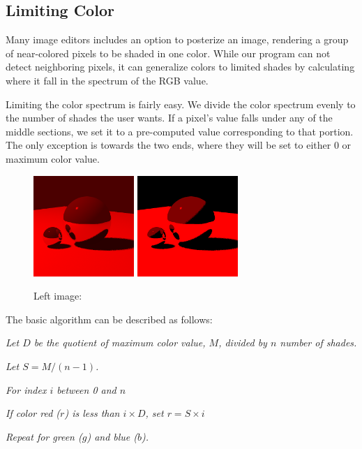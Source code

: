 \documentclass{acmsiggraph}
\begin{document}
\subsection{Limiting Color}
Many image editors includes an option to posterize an image, rendering a group
of near-colored pixels to be shaded in one color.  While our program can not
detect neighboring pixels, it can generalize colors to limited shades by
calculating where it fall in the spectrum of the RGB value.

Limiting the color spectrum is fairly easy.  We divide the color spectrum
evenly to the number of shades the user wants.  If a pixel's value falls under
any of the middle sections, we set it to a pre-computed value corresponding to
that portion.  The only exception is towards the two ends, where they will be
set to either 0 or maximum color value.
\begin{figure}[htp]
\centering
\includegraphics[width=1.5in]{red_scale}
\includegraphics[width=1.5in]{red_shades}
\caption{Left image: }%
\label{red_limiting_color}
\end{figure}

The basic algorithm can be described as follows:

\textit{Let $D$ be the quotient of maximum color value, $M$, divided by $n$
number of shades.}

\textit{Let $S = M / (n - 1)$.}

\textit{For index $i$ between 0 and $n$}

\hspace{10 mm} \textit{If color red ($r$) is less than $i \times D$, set $r = S
\times i$ }

\textit{Repeat for green ($g$) and blue ($b$).}
\end{document}
